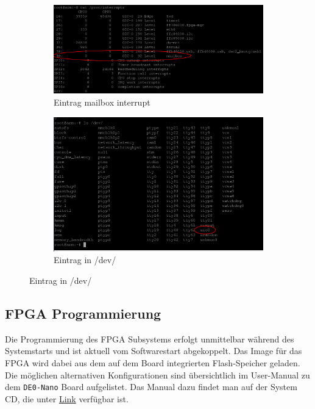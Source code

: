 \begin{figure}
	\centering
	\begin{subfigure}[a]{0.7\textwidth}
	\includegraphics[width=1\linewidth]{Abb/arm_interrupts.png}
	\caption{Eintrag mailbox interrupt}
	\label{SW:arm:interrupts}
	\end{subfigure}
	\begin{subfigure}[b]{0.7\textwidth}
	\includegraphics[width=1\textwidth]{Abb/arm_devices.png}
	\caption{Eintrag in /dev/}
	\label{SW:arm:devices}
	\end{subfigure}
\end{figure}

\subsection{\ac{FPGA} Programmierung}
Die Programmierung des \ac{FPGA} Subsystems erfolgt unmittelbar während des Systemstarts und ist aktuell vom Softwarestart abgekoppelt. Das Image für das \ac{FPGA} wird dabei aus dem auf dem Board integrierten Flash-Speicher geladen. Die möglichen alternativen Konfigurationen sind übersichtlich im User-Manual zu dem \texttt{DE0-Nano} Board aufgelistet. Das Manual dazu findet man auf der System CD, die unter \href{http://www.terasic.com/downloads/cd-rom/de0-nano-soc/}{Link} verfügbar ist.\\

